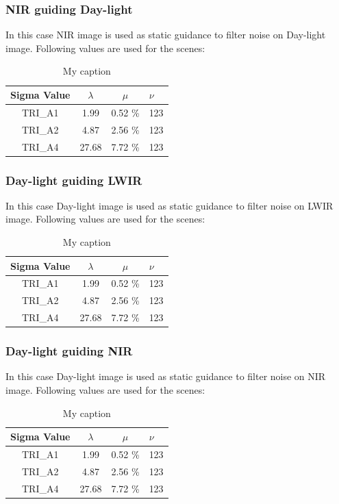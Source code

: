 \documentclass[10pt,twocolumn,letterpaper]{article}
\begin{document}
\subsubsection{NIR guiding Day-light}
In this case NIR image is used as static guidance to filter noise on Day-light image. Following values are used for the scenes:
\begin{table}[ht]
	\centering
	\caption{My caption}
	\label{my-label}
	\begin{tabular}{@{}cccl@{}}
		\toprule
		\bfseries Sigma Value & \(\lambda\) & \(\mu\) & \(\nu\) \\ \midrule
		TRI\_A1               & 1.99        & 0.52 \% & 123       \\
		TRI\_A2               & 4.87        & 2.56 \% & 123        \\
		TRI\_A4               & 27.68       & 7.72 \% & 123        \\ \bottomrule
	\end{tabular}
\end{table}
\subsubsection{Day-light guiding LWIR}
In this case Day-light image is used as static guidance to filter noise on LWIR image. Following values are used for the scenes:
\begin{table}[ht]
	\centering
	\caption{My caption}
	\label{my-label}
	\begin{tabular}{@{}cccl@{}}
		\toprule
		\bfseries Sigma Value & \(\lambda\) & \(\mu\) & \(\nu\) \\ \midrule
		TRI\_A1               & 1.99        & 0.52 \% & 123       \\
		TRI\_A2               & 4.87        & 2.56 \% & 123        \\
		TRI\_A4               & 27.68       & 7.72 \% & 123        \\ \bottomrule
	\end{tabular}
\end{table}
\subsubsection{Day-light guiding NIR}
In this case Day-light image is used as static guidance to filter noise on NIR image. Following values are used for the scenes:
\begin{table}[ht]
	\centering
	\caption{My caption}
	\label{my-label}
	\begin{tabular}{@{}cccl@{}}
		\toprule
		\bfseries Sigma Value & \(\lambda\) & \(\mu\) & \(\nu\) \\ \midrule
		TRI\_A1               & 1.99        & 0.52 \% & 123       \\
		TRI\_A2               & 4.87        & 2.56 \% & 123        \\
		TRI\_A4               & 27.68       & 7.72 \% & 123        \\ \bottomrule
	\end{tabular}
\end{table}
{\small


}
\end{document}

